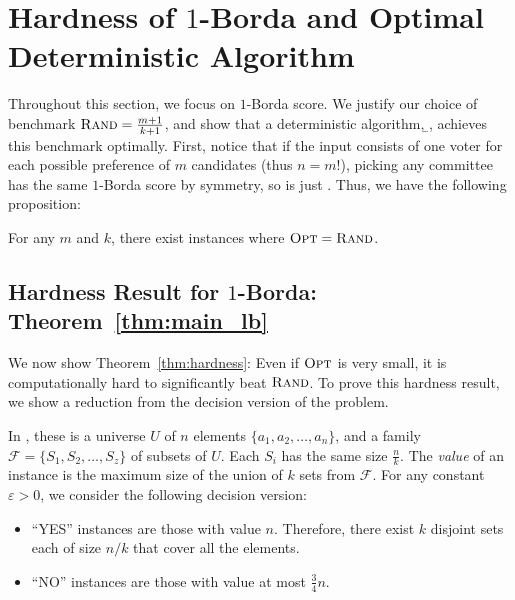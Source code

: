 \section{Hardness of $1$-Borda and Optimal Deterministic Algorithm}
\label{sec:lower}
Throughout this section, we focus on $1$-Borda score. We justify our choice of benchmark ${\normalfont\textsc{Rand}} = \frac{m + 1}{k + 1}$, and show that a deterministic algorithm, \b{}, achieves this benchmark optimally. First, notice that if the input consists of one voter for each possible preference of $m$ candidates (thus $n = m!$), picking any committee has the same $1$-Borda score by symmetry, so \opt{} is just \rand. Thus, we have the following proposition:
\begin{proposition}
For any $m$ and $k$, there exist instances where ${\normalfont\textsc{Opt}} = {\normalfont\textsc{Rand}}$.
\end{proposition}

\subsection{Hardness Result for $1$-Borda: Theorem~\ref{thm:main_lb}}
We now show Theorem~\ref{thm:hardness}: Even if ${\normalfont\textsc{Opt}}$ is very small, it is computationally hard to significantly beat ${\normalfont\textsc{Rand}}$. 
To prove this hardness result, we show a reduction from the decision version of the \rc{} problem. 
\begin{definition}
In \rc{}, these is a universe $U$ of $n$ elements $\{a_1, a_2, \ldots, a_n\}$, and a family $\mathcal{F} = \{S_1, S_2, \ldots, S_z\}$ of subsets of $U$. Each $S_i$ has the same size $\frac{n}{k}$. The {\em value} of an instance is the maximum size of the union of $k$ sets from $\mathcal{F}$. For any constant $\varepsilon > 0$, we consider the following decision version:
\begin{itemize}
    \item ``YES'' instances are those with value $n$. Therefore, there exist $k$ disjoint sets each of size $n/k$ that cover all the elements.
    \item ``NO'' instances are those with value at most $\frac{3}{4}n$.
\end{itemize}
\label{def:k_cover}
\end{definition}

